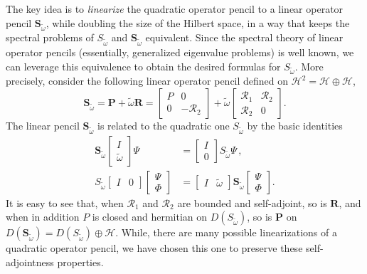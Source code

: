 \documentclass[aps, prd, amsmath, floats, floatfix, twocolumn, nofootinbib, superscriptaddress, showpacs]{revtex4-1}
\def\H{\mathcal{H}}
\def\P{\mathbf{P}}
\def\R{\mathbf{R}}
\def\bS{\mathbf{S}}
\def\cR{\mathcal{R}}
\def\tomega{{\tilde{\omega}}}
\begin{document}
The key idea is to \emph{linearize} the quadratic operator pencil to a
linear operator pencil $\bS_\tomega$, while doubling the size of the
Hilbert space, in a way that keeps the spectral problems of $S_\tomega$
and $\bS_\tomega$ equivalent. Since the spectral theory of linear operator
pencils (essentially, generalized eigenvalue problems) is well known, we
can leverage this equivalence to obtain the desired formulas for
$S_\tomega$. More precisely, consider the following linear operator
pencil defined on $\H^2 = \H \oplus \H$,
\begin{equation}\label{eq:linearpencil}
\bS_\tomega
= \P + \tomega \R
= \begin{bmatrix}
P & 0 \\
0 & -\cR_2
\end{bmatrix}
+ \tomega \begin{bmatrix}
\cR_1 & \cR_2 \\
\cR_2 & 0
\end{bmatrix} .
\end{equation}
The linear pencil $\bS_\tomega$ is related to the quadratic one $S_\tomega$
by the basic identities
\begin{align}
\bS_\tomega
\begin{bmatrix} I \\ \tomega \end{bmatrix} \Psi
&= \begin{bmatrix} I \\ 0 \end{bmatrix} S_\tomega \Psi \, ,
\\
S_\tomega \begin{bmatrix} I & 0 \end{bmatrix}
\begin{bmatrix} \Psi \\ \Phi \end{bmatrix}
&= \begin{bmatrix} I & \tomega \end{bmatrix}
\bS_\tomega
\begin{bmatrix} \Psi \\ \Phi \end{bmatrix} .
\end{align}
It is easy to see that, when $\cR_1$ and $\cR_2$ are bounded and
self-adjoint, so is $\R$, and when in addition $P$ is closed and
hermitian on $D(S_\tomega)$, so is $\P$ on $D(\bS_\tomega) = D(S_\tomega) \oplus \H$. While,
there are many possible linearizations of a quadratic operator pencil,
we have chosen this one to preserve these self-adjointness properties. 
\end{document}
